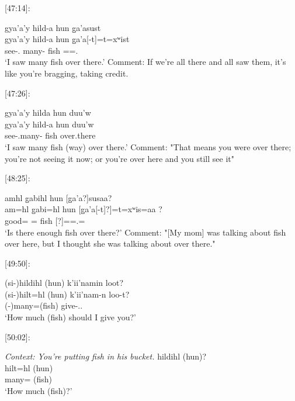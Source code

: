[47:14]:
\begin{exe}
    \ex \glll
    gya'a'y hild-a hun g̱a'asust \\
    gya'a'y hild-a hun  g̱a'a[-t]=t=xʷist \\
    see-\Fsg.\I{} many-\Attr{} fish \Loc[3.\Ii]=\Pn=\Dem.\Dist \\
    \glt `I saw many fish over there.' 
    Comment: If we're all there and all saw them, it's like you're bragging, taking credit. 
\end{exe}

[47:26]:
\begin{exe}
    \ex \glll
    gya'a'y hilda hun duu'w \\
    gya'a'y hild-a hun  duu'w \\
    see-\Fsg.\Ii[=\Cn?] many-\Attr{} fish over.there \\
    \glt `I saw many fish (way) over there.' 
    Comment: "That means you were over there; you're not seeing it now; or you're over here and you still see it"
\end{exe}

[48:25]:
\begin{exe}
    \ex \glll
    amhl g̱abihl hun [g̱a'a?]susaa?  \\
    am=hl g̱abi=hl hun [g̱a'a[-t]?]=t=xʷis=aa ?  \\
    good=\Cn{} \Cnt=\Cn{} fish [\Loc[3.\Ii]?]=\Pn=\Dem.\Dist=\Q \\
    \glt `Is there enough fish over there?'
    Comment: "[My mom] was talking about fish over here, but I thought she was talking about over there." 
\end{exe}

[49:50]:
\begin{exe}
    \ex \glll
    (si-)hildihl (hun) k'ii'namin loot? \\
    (si-)hilt=hl (hun) k'ii'nam-n loo-t? \\
    (-)many=\Cn (fish) give-\Ssg.\Ii {}.\Ii \\
    \glt `How much (fish) should I give you?'
\end{exe}


[50:02]:
\begin{exe}
    \ex \textit{Context: You're putting fish in his bucket.} \glll
    hildihl (hun)? \\
    hilt=hl (hun) \\
    many=\Cn{} (fish) \\
    \glt `How much (fish)?'
\end{exe}

